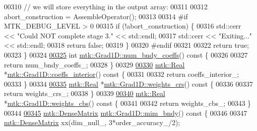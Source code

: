 \begin{DoxyCode}
{{00310   \textcolor{comment}{// we will store everything in the output array:}
00311 
00312   abort\_construction = AssembleOperator();
00313 
00314 \textcolor{preprocessor}{  #if MTK\_DEBUG\_LEVEL > 0}
00315   \textcolor{keywordflow}{if} (!abort\_construction) \{
00316     std::cerr << \textcolor{stringliteral}{"Could NOT complete stage 3."} << std::endl;
00317     std::cerr << \textcolor{stringliteral}{"Exiting..."} << std::endl;
00318     \textcolor{keywordflow}{return} \textcolor{keyword}{false};
00319   \}
00320 \textcolor{preprocessor}{  #endif}
00321 
00322   \textcolor{keywordflow}{return} \textcolor{keyword}{true};
00323 \}
00324 
\hypertarget{mtk__grad__1d_8cc_source_l00325}{}\hyperlink{classmtk_1_1Grad1D_a7168205c21ba00012558f8bba069c119}{00325} \textcolor{keywordtype}{int} \hyperlink{classmtk_1_1Grad1D_a7168205c21ba00012558f8bba069c119}{mtk::Grad1D::num\_bndy\_coeffs}()\textcolor{keyword}{ const }\{
00326 
00327   \textcolor{keywordflow}{return} num\_bndy\_coeffs\_;
00328 \}
00329 
\hypertarget{mtk__grad__1d_8cc_source_l00330}{}\hyperlink{classmtk_1_1Grad1D_a88735f8d2a6ed986370dc3caeb84959b}{00330} \hyperlink{group__c01-roots_gac080bbbf5cbb5502c9f00405f894857d}{mtk::Real} *\hyperlink{classmtk_1_1Grad1D_a88735f8d2a6ed986370dc3caeb84959b}{mtk::Grad1D::coeffs\_interior}()\textcolor{keyword}{ const }\{
00331 
00332   \textcolor{keywordflow}{return} coeffs\_interior\_;
00333 \}
00334 
\hypertarget{mtk__grad__1d_8cc_source_l00335}{}\hyperlink{classmtk_1_1Grad1D_ae5f15d8986a5680b6a1c120283c6cc5e}{00335} \hyperlink{group__c01-roots_gac080bbbf5cbb5502c9f00405f894857d}{mtk::Real} *\hyperlink{classmtk_1_1Grad1D_ae5f15d8986a5680b6a1c120283c6cc5e}{mtk::Grad1D::weights\_crs}()\textcolor{keyword}{ const }\{
00336 
00337   \textcolor{keywordflow}{return} weights\_crs\_;
00338 \}
00339 
\hypertarget{mtk__grad__1d_8cc_source_l00340}{}\hyperlink{classmtk_1_1Grad1D_ad11927d8f9f1ca0089aaa2be7094f7f3}{00340} \hyperlink{group__c01-roots_gac080bbbf5cbb5502c9f00405f894857d}{mtk::Real} *\hyperlink{classmtk_1_1Grad1D_ad11927d8f9f1ca0089aaa2be7094f7f3}{mtk::Grad1D::weights\_cbs}()\textcolor{keyword}{ const }\{
00341 
00342   \textcolor{keywordflow}{return} weights\_cbs\_;
00343 \}
00344 
\hypertarget{mtk__grad__1d_8cc_source_l00345}{}\hyperlink{classmtk_1_1Grad1D_ab25e1d064a5a00fbe3777e65fd5750c0}{00345} \hyperlink{classmtk_1_1DenseMatrix}{mtk::DenseMatrix} \hyperlink{classmtk_1_1Grad1D_ab25e1d064a5a00fbe3777e65fd5750c0}{mtk::Grad1D::mim\_bndy}()\textcolor{keyword}{ const }\{
00346 
00347   \hyperlink{classmtk_1_1DenseMatrix}{mtk::DenseMatrix} xx(dim\_null\_, 3*order\_accuracy\_/2);
}}
\end{DoxyCode}
